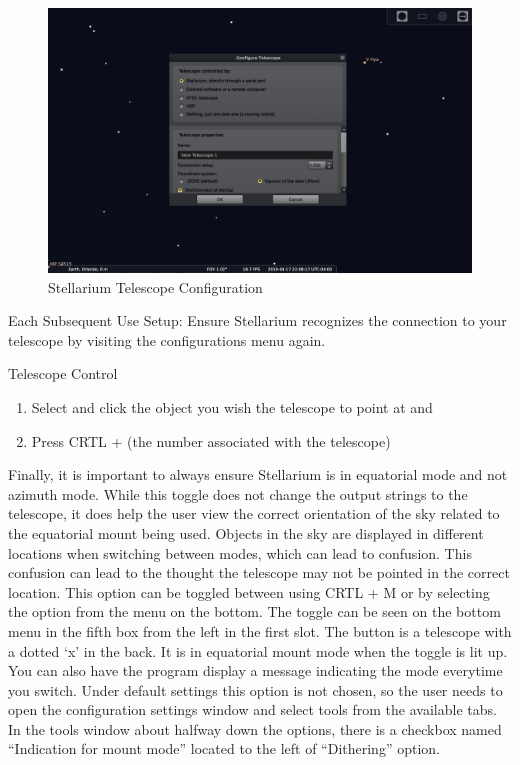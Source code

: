 \documentclass[12pt]{article}
\begin{document}
\begin{figure}[h]
	\centering
	\includegraphics[width=0.75\linewidth]{stellConfig}
	\caption{Stellarium Telescope Configuration}
  \label{fig:stellConfig}
\end{figure}

Each Subsequent Use Setup: Ensure Stellarium recognizes the connection to your telescope by visiting the configurations menu again.

Telescope Control
\begin{enumerate}
\item Select and click the object you wish the telescope to point at and
\item Press CRTL + (the number associated with the telescope)
\end{enumerate}

Finally, it is important to always ensure Stellarium is in equatorial mode and not azimuth mode. While this toggle does not change the output strings to the telescope, it does help the user view the correct orientation of the sky related to the equatorial mount being used. Objects in the sky are displayed in different locations when switching between modes, which can lead to confusion. This confusion can lead to the thought the telescope may not be pointed in the correct location. This option can be toggled between using CRTL + M or by selecting the option from the menu on the bottom. The toggle can be seen on the bottom menu in the fifth box from the left in the first slot. The button is a telescope with a dotted ‘x’ in the back. It is in equatorial mount mode when the toggle is lit up. You can also have the program display a message indicating the mode everytime you switch. Under default settings this option is not chosen, so the user needs to open the configuration settings window and select tools from the available tabs. In the tools window about halfway down the options, there is a checkbox named “Indication for mount mode” located to the left of “Dithering” option.
\end{document}
